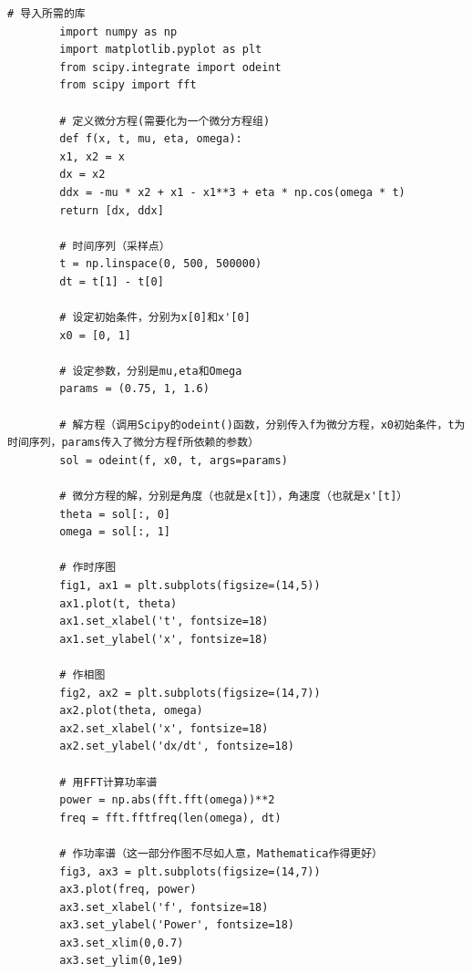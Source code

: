 \documentclass[dvipsnames, svgnames,a4paper,11pt]{article}
\begin{document}
	\begin{lstlisting}[style=pythonstyle,caption=代码记录（Python）]
		# 导入所需的库
		import numpy as np
		import matplotlib.pyplot as plt
		from scipy.integrate import odeint
		from scipy import fft
		
		# 定义微分方程(需要化为一个微分方程组)
		def f(x, t, mu, eta, omega):
		x1, x2 = x
		dx = x2
		ddx = -mu * x2 + x1 - x1**3 + eta * np.cos(omega * t)
		return [dx, ddx]
		
		# 时间序列（采样点）
		t = np.linspace(0, 500, 500000)
		dt = t[1] - t[0]
		
		# 设定初始条件，分别为x[0]和x'[0]
		x0 = [0, 1]
		
		# 设定参数，分别是mu,eta和Omega
		params = (0.75, 1, 1.6)
		
		# 解方程（调用Scipy的odeint()函数，分别传入f为微分方程，x0初始条件，t为时间序列，params传入了微分方程f所依赖的参数）
		sol = odeint(f, x0, t, args=params)
		
		# 微分方程的解，分别是角度（也就是x[t]），角速度（也就是x'[t]）
		theta = sol[:, 0]
		omega = sol[:, 1]
		
		# 作时序图
		fig1, ax1 = plt.subplots(figsize=(14,5))
		ax1.plot(t, theta)
		ax1.set_xlabel('t', fontsize=18)
		ax1.set_ylabel('x', fontsize=18)
		
		# 作相图
		fig2, ax2 = plt.subplots(figsize=(14,7))
		ax2.plot(theta, omega)
		ax2.set_xlabel('x', fontsize=18)
		ax2.set_ylabel('dx/dt', fontsize=18)
		
		# 用FFT计算功率谱
		power = np.abs(fft.fft(omega))**2
		freq = fft.fftfreq(len(omega), dt)
		
		# 作功率谱（这一部分作图不尽如人意，Mathematica作得更好）
		fig3, ax3 = plt.subplots(figsize=(14,7))
		ax3.plot(freq, power)
		ax3.set_xlabel('f', fontsize=18)
		ax3.set_ylabel('Power', fontsize=18)
		ax3.set_xlim(0,0.7)
		ax3.set_ylim(0,1e9)
	\end{lstlisting}
	
\end{document}
